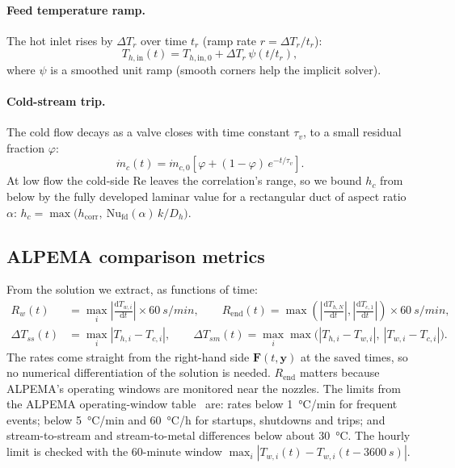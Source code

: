 \documentclass[11pt]{article}
\newcommand{\dd}{\mathrm{d}}
\newcommand{\Rey}{\mathrm{Re}}
\newcommand{\hin}{_{h,\mathrm{in}}}
\begin{document}
\paragraph{Feed temperature ramp.} The hot inlet rises by $\Delta T_r$ over time $t_r$ (ramp rate $r = \Delta T_r / t_r$):
\begin{equation}
  T\hin(t) = T_{h,\mathrm{in},0} + \Delta T_r\,\psi(t/t_r),
\end{equation}
where $\psi$ is a smoothed unit ramp (smooth corners help the implicit solver).

\paragraph{Cold-stream trip.} The cold flow decays as a valve closes with time constant $\tau_v$, to a small residual fraction $\varphi$:
\begin{equation}
  \dot m_c(t) = \dot m_{c,0}\left[\varphi + (1 - \varphi)\, e^{-t/\tau_v}\right].
\end{equation}
At low flow the cold-side $\Rey$ leaves the correlation's range, so we bound $h_c$ from below by the fully developed laminar value for a rectangular duct of aspect ratio $\alpha$: $h_c = \max\!\big(h_{\mathrm{corr}},\ \mathrm{Nu}_{\mathrm{fd}}(\alpha)\, k/D_h\big)$.

\subsection{ALPEMA comparison metrics}

From the solution we extract, as functions of time:
\begin{align}
  R_w(t) &= \max_i \left|\frac{\dd T_{w,i}}{\dd t}\right| \times \SI{60}{s/min},
  \qquad
  R_{\mathrm{end}}(t) = \max\left(\left|\frac{\dd T_{h,N}}{\dd t}\right|, \left|\frac{\dd T_{c,1}}{\dd t}\right|\right) \times \SI{60}{s/min}, \\
  \Delta T_{ss}(t) &= \max_i |T_{h,i} - T_{c,i}|,
  \qquad
  \Delta T_{sm}(t) = \max_i \max\big(|T_{h,i} - T_{w,i}|,\ |T_{w,i} - T_{c,i}|\big).
\end{align}
The rates come straight from the right-hand side $\bm F(t,\bm y)$ at the saved times, so no numerical differentiation of the solution is needed. $R_{\mathrm{end}}$ matters because ALPEMA's operating windows are monitored near the nozzles. The limits from the ALPEMA operating-window table~\cite{alpema2025} are: rates below \SI{1}{\celsius/min} for frequent events; below \SI{5}{\celsius/min} and \SI{60}{\celsius/h} for startups, shutdowns and trips; and stream-to-stream and stream-to-metal differences below about \SI{30}{\celsius}. The hourly limit is checked with the 60-minute window $\max_i |T_{w,i}(t) - T_{w,i}(t - \SI{3600}{s})|$.
\end{document}
